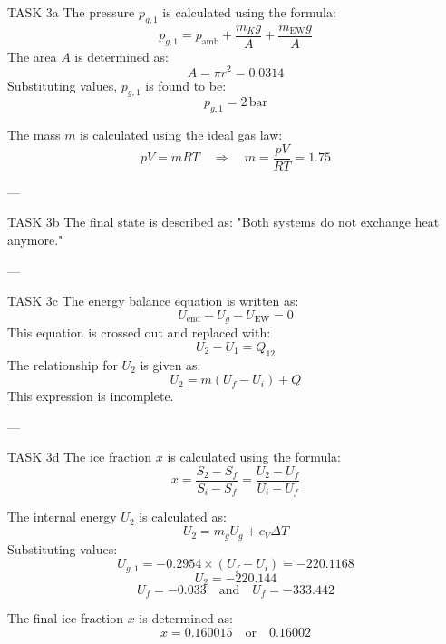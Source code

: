 TASK 3a  
The pressure \( p_{g,1} \) is calculated using the formula:  
\[
p_{g,1} = p_{\text{amb}} + \frac{m_K g}{A} + \frac{m_{\text{EW}} g}{A}
\]  
The area \( A \) is determined as:  
\[
A = \pi r^2 = 0.0314
\]  
Substituting values, \( p_{g,1} \) is found to be:  
\[
p_{g,1} = 2 \, \text{bar}
\]  

The mass \( m \) is calculated using the ideal gas law:  
\[
p V = m R T \quad \Rightarrow \quad m = \frac{p V}{R T} = 1.75
\]  

---

TASK 3b  
The final state is described as:  
"Both systems do not exchange heat anymore."  

---

TASK 3c  
The energy balance equation is written as:  
\[
U_{\text{end}} - U_g - U_{\text{EW}} = 0
\]  
This equation is crossed out and replaced with:  
\[
U_2 - U_1 = Q_{12}
\]  
The relationship for \( U_2 \) is given as:  
\[
U_2 = m(U_f - U_i) + Q
\]  
This expression is incomplete.  

---

TASK 3d  
The ice fraction \( x \) is calculated using the formula:  
\[
x = \frac{S_2 - S_f}{S_i - S_f} = \frac{U_2 - U_f}{U_i - U_f}
\]  

The internal energy \( U_2 \) is calculated as:  
\[
U_2 = m_g U_g + c_V \Delta T
\]  
Substituting values:  
\[
U_{g,1} = -0.2954 \times (U_f - U_i) = -220.1168
\]  
\[
U_2 = -220.144
\]  
\[
U_f = -0.033 \quad \text{and} \quad U_f = -333.442
\]  

The final ice fraction \( x \) is determined as:  
\[
x = 0.160015 \quad \text{or} \quad 0.16002
\]  
